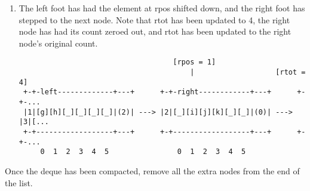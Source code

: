 \begin{enumerate}
	      \pagebreak
	\item The left foot has had the element at rpos shifted down, and the
	      right foot has stepped to the next node. Note that rtot has been
	      updated to 4, the right node has had its count zeroed out, and
	      rtot has been updated to the right node's original count.


	      \begin{verbatim}
                                    [rpos = 1]                        				
                                        |                   [rtot = 4]
 +-+-left-------------+---+      +-+-right------------+---+      +-+-... 
 |1|[g][h][_][_][_][_]|(2)| ---> |2|[_][i][j][k][_][_]|(0)| ---> |3|[...
 +-+------------------+---+      +-+------------------+---+      +-+-...
     0  1  2  3  4  5                0  1  2  3  4  5                 
				\end{verbatim}


\end{enumerate}

Once the deque has been compacted, remove all the extra nodes from the
end of the list.
